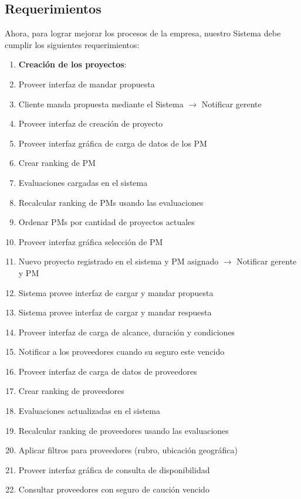 \subsection{Requerimientos}

Ahora, para lograr mejorar los procesos de la empresa, nuestro Sistema debe cumplir los siguientes requerimientos:

\begin{enumerate}

	\item[] \textbf{Creación de los proyectos}:
    
	\item Proveer interfaz de mandar propuesta
	\item Cliente manda propuesta mediante el Sistema $\rightarrow$ Notificar gerente
	\item Proveer interfaz de creación de proyecto
	\item Proveer interfaz gráfica de carga de datos de los PM
	\item Crear ranking de PM
	\item Evaluaciones cargadas en el sistema
	\item Recalcular ranking de PMs usando las evaluaciones
	\item Ordenar PMs por cantidad de proyectos actuales
	\item Proveer interfaz gráfica selección de PM
	\item Nuevo proyecto registrado en el sistema y PM asignado $\rightarrow$ Notificar gerente y PM
	\item Sistema provee interfaz de cargar y mandar propuesta
	\item Sistema provee interfaz de cargar y mandar respuesta
	\item Proveer interfaz de carga de alcance, duración y condiciones
	\item Notificar a los proveedores cuando su seguro este vencido
	\item Proveer interfaz de carga de datos de proveedores
	\item Crear ranking de proveedores
	\item Evaluaciones actualizadas en el sistema
	\item Recalcular ranking de proveedores usando las evaluaciones
	\item Aplicar filtros para proveedores (rubro, ubicación geográfica)	
	\item Proveer interfaz gráfica de consulta de disponibilidad
	\item Consultar proveedores con seguro de caución vencido

\end{enumerate}
